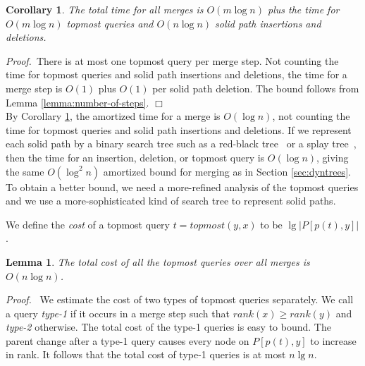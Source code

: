 \documentclass[twoside,leqno,twocolumn]{article}
\newtheorem{lemma}{Lemma}
\newtheorem{corollary}{Corollary}
\newcommand{\proof}{\noindent \emph{Proof.}\ }
\newcommand{\proofend}{$\Box$\\}
\newcommand{\rank}{\mathit{rank}}
\begin{document}
\begin{corollary}
\label{cor:number-of-steps} The total time for all merges is $O(m \log n)$ plus the time for $O(m \log n)$ topmost queries and $O(n \log n)$ solid path insertions and deletions.
\end{corollary}
\proof There is at most one topmost query per merge step.  Not counting the time for topmost queries and solid path insertions and deletions, the time for a merge step is $O(1)$ plus $O(1)$ per solid path deletion.  The bound follows from Lemma \ref{lemma:number-of-steps}. \proofend

By Corollary \ref{cor:number-of-steps}, the amortized time for a merge is $O(\log n)$, not counting the time for topmost queries and solid path insertions and deletions.  If we represent each solid path by a binary search tree such as a red-black tree~\cite{GS78} or a splay tree~\cite{ST85}, then the time for an insertion, deletion, or topmost query is $O(\log n)$, giving the same $O(\log^2 n)$ amortized bound for merging as in Section \ref{sec:dyntrees}.  To obtain a better bound, we need a more-refined analysis of the topmost queries and we use a more-sophisticated kind of search tree to represent solid paths.

We define the \emph{cost} of a topmost query $t = \mathit{topmost}(y,x)$ to be $\lg |P[p(t),y]|$.

\begin{lemma}
\label{lemma:topmost}
The total cost of all the topmost queries over all merges is $O(n \log n)$.
\end{lemma}
\proof
We estimate the cost of two types of topmost queries separately.  We call a query \emph{type-1} if it occurs in a merge step such that $\rank(x) \ge \rank(y)$ and \emph{type-2} otherwise.  The total cost of the type-1 queries is easy to bound.  The parent change after a type-1 query causes every node on $P[p(t), y]$ to increase in rank.  It follows that the total cost of type-1 queries is at most $n \lg n$.
\end{document}
